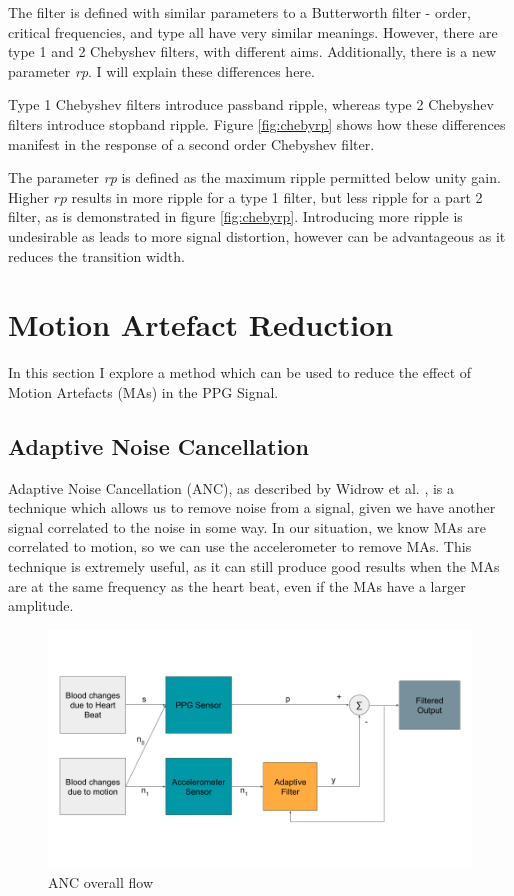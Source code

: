 \documentclass[12pt,a4paper,twoside,openany]{report}
\begin{document}
The filter is defined with similar parameters to a Butterworth filter - order,
critical frequencies, and type all have very similar meanings. However,
there are type 1 and 2 Chebyshev filters, with different aims. Additionally,
there is a new parameter \emph{rp}. I will explain these differences here.

Type 1 Chebyshev filters introduce passband ripple, whereas type 2 Chebyshev 
filters introduce stopband ripple. Figure \ref{fig:chebyrp} shows how these
differences manifest in the response of a second order Chebyshev filter.

The parameter \emph{rp} is defined as the maximum ripple permitted below unity
gain. Higher \(rp\) results in more ripple for a type 1 filter, but less
ripple for a part 2 filter, as is demonstrated in figure \ref{fig:chebyrp}.
Introducing more ripple is undesirable as leads to more signal distortion,
however can be advantageous as it reduces the transition width.

\section{Motion Artefact Reduction}

In this section I explore a method which can be used to reduce the effect of 
Motion Artefacts (MAs) in the PPG Signal.

\subsection{Adaptive Noise Cancellation}

Adaptive Noise Cancellation (ANC), as described by Widrow et al.
\cite{Widrow75}, is a technique which allows us to remove noise from a signal,
given we have another signal correlated to the noise in some way. In our 
situation, we know MAs are correlated to motion, so we can use the 
accelerometer to remove MAs. This technique is extremely useful, as it can 
still produce good results when the MAs are at the same frequency as the heart
beat, even if the MAs have a larger amplitude.



\begin{figure}[tbh]
	\centerline{\includegraphics[width=\textwidth]{figs/ANC-concept.png}}
\caption{ANC overall flow}
\label{epsfig}
\end{figure}
\end{document}
